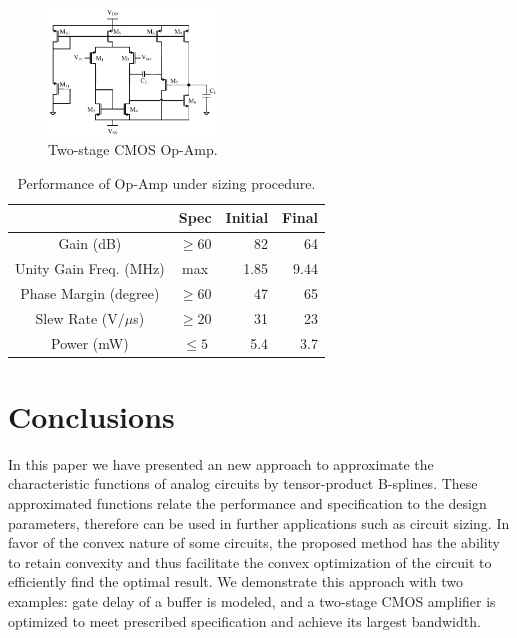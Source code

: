 \documentclass{sig-alternate}
\begin{document}
\begin{figure}[!tb]{\centering
\includegraphics[width=0.4\textwidth]{./figs/two-stage}
\caption{Two-stage CMOS Op-Amp.}
\label{fig:opamp}}
\end{figure}

\begin{table}[!htb]
  \centering
  \caption{Performance of Op-Amp under sizing procedure.}\label{tab:spec}
  \begin{tabular}{|c|c|r|r|}
    \hline
               &\multicolumn{1}{|c|}{Spec}&\multicolumn{1}{|c|}{Initial}&\multicolumn{1}{|c|}{Final}\\
    \hline\hline
    Gain (dB)              &$\geq 60$& 82 & 64    \\
    Unity Gain Freq. (MHz) &  max    & 1.85 & 9.44  \\
    Phase Margin (degree)  &$\geq 60$& 47 & 65    \\
    Slew Rate (V/$\mu$s)   &$\geq 20$& 31 & 23    \\
    Power (mW)             &$\leq 5$ & 5.4 & 3.7   \\ 
    \hline
  \end{tabular}
\end{table}


\section{Conclusions}\label{sec:conclusion}
In this paper we have presented an new approach to approximate the
characteristic functions of analog circuits by tensor-product B-splines. These
approximated functions relate the performance and specification to the
design parameters, therefore can be used in further applications such as
circuit sizing. In favor of the convex nature of some circuits, the
proposed method has the ability to retain convexity and
thus facilitate the convex optimization of the circuit to efficiently
find the optimal result. We demonstrate this approach with two
examples: gate delay of a buffer is modeled, and a two-stage CMOS
amplifier is optimized to meet prescribed specification and achieve
its largest bandwidth. 


 \scriptsize

\end{document}
